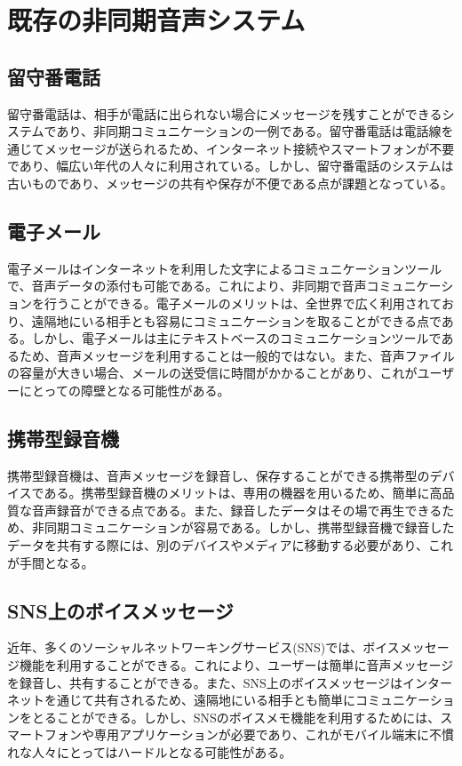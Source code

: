 \documentclass[submit,techrep,noauthor]{ipsj}
\begin{document}
\section{既存の非同期音声システム}



\subsection{留守番電話}
留守番電話は、相手が電話に出られない場合にメッセージを残すことができるシステムであり、非同期コミュニケーションの一例である。留守番電話は電話線を通じてメッセージが送られるため、インターネット接続やスマートフォンが不要であり、幅広い年代の人々に利用されている。しかし、留守番電話のシステムは古いものであり、メッセージの共有や保存が不便である点が課題となっている。

\subsection{電子メール}
電子メールはインターネットを利用した文字によるコミュニケーションツールで、音声データの添付も可能である。これにより、非同期で音声コミュニケーションを行うことができる。電子メールのメリットは、全世界で広く利用されており、遠隔地にいる相手とも容易にコミュニケーションを取ることができる点である。しかし、電子メールは主にテキストベースのコミュニケーションツールであるため、音声メッセージを利用することは一般的ではない。また、音声ファイルの容量が大きい場合、メールの送受信に時間がかかることがあり、これがユーザーにとっての障壁となる可能性がある。

\subsection{携帯型録音機}
携帯型録音機は、音声メッセージを録音し、保存することができる携帯型のデバイスである。携帯型録音機のメリットは、専用の機器を用いるため、簡単に高品質な音声録音ができる点である。また、録音したデータはその場で再生できるため、非同期コミュニケーションが容易である。しかし、携帯型録音機で録音したデータを共有する際には、別のデバイスやメディアに移動する必要があり、これが手間となる。

\subsection{SNS上のボイスメッセージ}
近年、多くのソーシャルネットワーキングサービス(SNS)では、ボイスメッセージ機能を利用することができる。これにより、ユーザーは簡単に音声メッセージを録音し、共有することができる。また、SNS上のボイスメッセージはインターネットを通じて共有されるため、遠隔地にいる相手とも簡単にコミュニケーションをとることができる。しかし、SNSのボイスメモ機能を利用するためには、スマートフォンや専用アプリケーションが必要であり、これがモバイル端末に不慣れな人々にとってはハードルとなる可能性がある。
\end{document}
